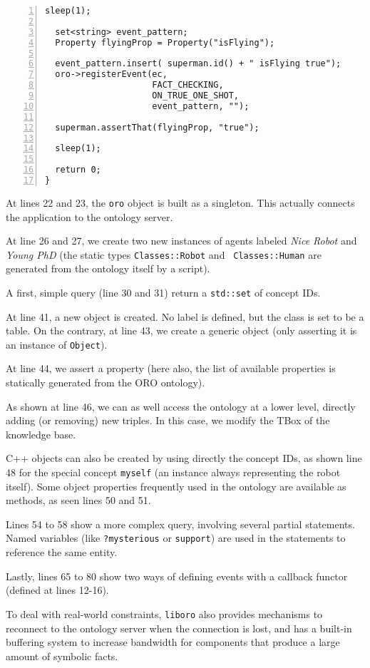 \begin{lstlisting}[numbers=left,caption=Example of interaction with {\tt oro-server} in C++, label = code|ex-cpp]
  sleep(1);
  
  set<string> event_pattern;
  Property flyingProp = Property("isFlying");
  
  event_pattern.insert( superman.id() + " isFlying true");
  oro->registerEvent(ec, 
                     FACT_CHECKING, 
                     ON_TRUE_ONE_SHOT, 
                     event_pattern, "");
  
  superman.assertThat(flyingProp, "true");
  
  sleep(1);
  
  return 0;
}

\end{lstlisting}

At lines 22 and 23, the {\tt oro} object is built as a singleton. This
actually connects the application to the ontology server.

At line 26 and 27, we create two new instances of agents labeled \emph{Nice
Robot} and \emph{Young PhD} (the static types {\tt Classes::Robot} and {\tt
Classes::Human} are generated from the ontology itself by a script).

A first, simple query (line 30 and 31) return a {\tt std::set} of concept IDs.

At line 41, a new object is created. No label is defined, but the
class is set to be a table. On the contrary, at line 43, we create a generic
object (only asserting it is an instance of {\tt Object}).

At line 44, we assert a property (here also, the list of available properties is
statically generated from the ORO ontology).

As shown at line 46, we can as well access the ontology at a lower level,
directly adding (or removing) new triples. In this case, we modify the TBox of
the knowledge base.

C++ objects can also be created by using directly the concept IDs, as shown
line 48 for the special concept {\tt myself} (an instance always representing
the robot itself). Some object properties frequently used in the ontology are
available as methods, as seen lines 50 and 51.

Lines 54 to 58 show a more complex query, involving several partial statements.
Named variables (like {\tt ?mysterious} or {\tt support}) are used in the
statements to reference the same entity.

Lastly, lines 65 to 80 show two ways of defining events with a callback functor
(defined at lines 12-16).

To deal with real-world constraints, {\tt liboro} also provides mechanisms to
reconnect to the ontology server when the connection is lost, and has a
built-in buffering system to increase bandwidth for components that produce a
large amount of symbolic facts.

